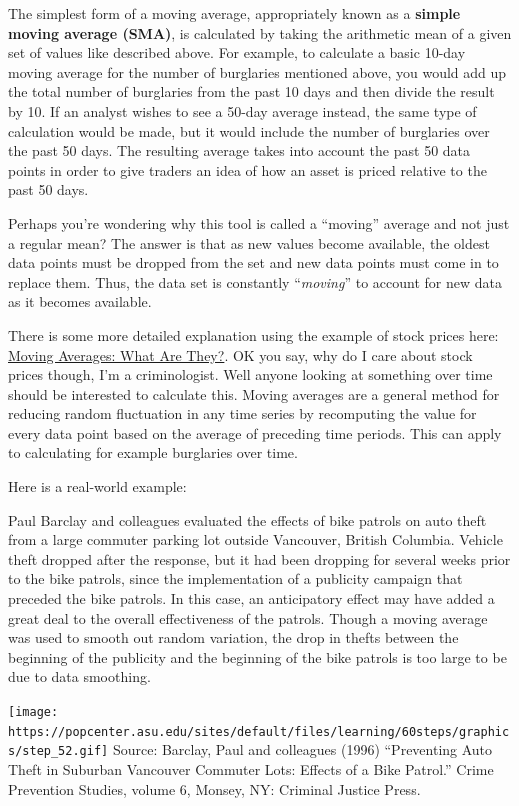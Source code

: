 \documentclass[
]{book}
\begin{document}
The simplest form of a moving average, appropriately known as a \textbf{simple moving average (SMA)}, is calculated by taking the arithmetic mean of a given set of values like described above. For example, to calculate a basic 10-day moving average for the number of burglaries mentioned above, you would add up the total number of burglaries from the past 10 days and then divide the result by 10. If an analyst wishes to see a 50-day average instead, the same type of calculation would be made, but it would include the number of burglaries over the past 50 days. The resulting average takes into account the past 50 data points in order to give traders an idea of how an asset is priced relative to the past 50 days.

Perhaps you're wondering why this tool is called a ``moving'' average and not just a regular mean? The answer is that as new values become available, the oldest data points must be dropped from the set and new data points must come in to replace them. Thus, the data set is constantly ``\emph{moving}'' to account for new data as it becomes available.

There is some more detailed explanation using the example of stock prices here: \href{http://www.investopedia.com/university/movingaverage/movingaverages1.asp\#ixzz4xbKq8xgI}{Moving Averages: What Are They?}. OK you say, why do I care about stock prices though, I'm a criminologist. Well anyone looking at something over time should be interested to calculate this. Moving averages are a general method for reducing random fluctuation in any time series by recomputing the value for every data point based on the average of preceding time periods. This can apply to calculating for example burglaries over time.

Here is a real-world example:

Paul Barclay and colleagues evaluated the effects of bike patrols on auto theft from a large commuter parking lot outside Vancouver, British Columbia. Vehicle theft dropped after the response, but it had been dropping for several weeks prior to the bike patrols, since the implementation of a publicity campaign that preceded the bike patrols. In this case, an anticipatory effect may have added a great deal to the overall effectiveness of the patrols. Though a moving average was used to smooth out random variation, the drop in thefts between the beginning of the publicity and the beginning of the bike patrols is too large to be due to data smoothing.

\texttt{[image: https://popcenter.asu.edu/sites/default/files/learning/60steps/graphics/step\_52.gif]}
Source: Barclay, Paul and colleagues (1996) ``Preventing Auto Theft in Suburban Vancouver Commuter Lots: Effects of a Bike Patrol.'' Crime Prevention Studies, volume 6, Monsey, NY: Criminal Justice Press.
\end{document}
